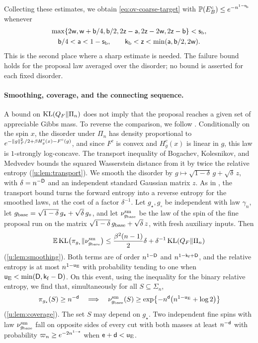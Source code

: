 Collecting these estimates, we obtain \eqref{eq:ov-coarse-target} with
$\mathbb P(E_B^c)\le e^{-n^{1-\mathsf{s}_{\rm b}}}$ whenever
\begin{gather*}
 \max\{2\mathsf{w},\mathsf{w}+\mathsf{b}/4,\mathsf{b}/2,2\mathsf{z}-\mathsf{a},2\mathsf{z}-2\mathsf{w},2\mathsf{z}-\mathsf{b}\}
 <\mathsf{s}_{\rm b},\\
 \mathsf{b}/4<\mathsf{a}<1-\mathsf{s}_{\rm b},\qquad
 \mathsf{k}_{\rm b}<\mathsf{z}<\min(\mathsf{a},\mathsf{b}/2,2\mathsf{w}).
\end{gather*}
This is the second place where a sharp estimate is needed. The failure bound
holds for the proposal law averaged over the disorder; no bound is asserted
for each fixed disorder.

\paragraph{Smoothing, coverage, and the connecting sequence.} A bound on
$\operatorname{KL}(Q_F\Vert\Pi_n)$ does not imply that the proposal reaches a given set of
appreciable Gibbs mass. To reverse the comparison, we follow
\cite[Section~5]{oai-typical-upper}. Conditionally on the spin $x$, the
disorder under $\Pi_n$ has density proportional to
$e^{-\lVert g\rVert_F^2/2+\beta H^c_g(x)-F^c(g)}$, and since $F^c$ is convex and
$H^c_g(x)$ is linear in $g$, this law is $1$-strongly log-concave. The
transport inequality of Bogachev, Kolesnikov, and Medvedev
\cite[Corollary~3.10]{bogachev-kolesnikov-medvedev-2005} bounds the squared
Wasserstein distance from it by twice the relative entropy
(\cref{u:lem:transport}). We smooth the disorder by
$g\mapsto\sqrt{1-\delta}\,g+\sqrt\delta\,z$, with $\delta=n^{-\mathsf{D}}$ and an
independent standard Gaussian matrix $z$. As in
\cite[Lemma~11]{lugosi-neu-2022}, the transport bound turns the forward
entropy into a reverse entropy for the smoothed laws, at the cost of a factor
$\delta^{-1}$. Let $g_\star,g_\circ$ be independent with law $\gamma_n$, let
$g_{\rm base}=\sqrt{1-\delta}\,g_\star+\sqrt\delta\,g_\circ$, and let
$\nu^{\rm sm}_{g_{\rm base}}$ be the law of the spin of the fine proposal run
on the matrix $\sqrt{1-\delta}\,g_{\rm base}+\sqrt\delta\,z$, with fresh
auxiliary inputs. Then
\[
 \mathbb E\operatorname{KL}\bigl(\pi_{g_\star}\Vert\nu^{\rm sm}_{g_{\rm base}}\bigr)
 \le\frac{\beta^2(n-1)}2\delta+\delta^{-1}\operatorname{KL}(Q_F\Vert\Pi_n)
\]
(\cref{u:lem:smoothing}). Both terms are of order $n^{1-\mathsf{D}}$ and
$n^{1-\mathsf{k}_{\rm f}+\mathsf{D}}$, and the relative entropy is at most
$n^{1-\mathsf{u}_{\rm E}}$ with probability tending to one when
$\mathsf{u}_{\rm E}<\min(\mathsf{D},\mathsf{k}_{\rm f}-\mathsf{D})$. On this event, using the
inequality for the binary relative entropy, we find that, simultaneously for
all $S\subseteq\Sigma_n$,
\[
 \pi_{g_\star}(S)\ge n^{-\mathsf{d}}\quad\Longrightarrow\quad
 \nu^{\rm sm}_{g_{\rm base}}(S)\ge
 \exp\bigl\{-n^{\mathsf{d}}\bigl(n^{1-\mathsf{u}_{\rm E}}+\log2\bigr)\bigr\}
\]
(\cref{u:lem:coverage}). The set $S$ may depend on $g_\star$. Two independent
fine spins with law $\nu^{\rm sm}_{g_{\rm base}}$ fall on opposite sides of
every cut with both masses at least $n^{-\mathsf{d}}$ with probability
$\varpi_n\ge e^{-2n^{1-\mathsf{e}}}$ when $\mathsf{e}+\mathsf{d}<\mathsf{u}_{\rm E}$.

